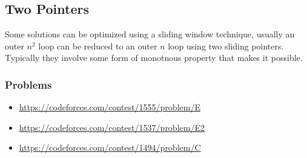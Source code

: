 \subsection{Two Pointers}
Some solutions can be optimized using a sliding window technique, usually an outer $n^2$ loop can be reduced to an outer $n$ loop using two sliding pointers. Typically they involve some form of  monotnous property that makes it possible. 
\subsubsection*{Problems}
\begin{itemize}
\item \url{https://codeforces.com/contest/1555/problem/E}
\item \url{https://codeforces.com/contest/1537/problem/E2}
\item \url{https://codeforces.com/contest/1494/problem/C} 
\end{itemize}